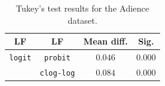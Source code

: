 \documentclass[journal]{IEEEtran}
\begin{document}
	
	\begin{table}[!t]
		\caption{Tukey's test results for the Adience dataset.}
		\label{table:TukeyAdience}
		\centering
		\begin{tabular}{cccc}
			\hline\hline
			       LF         &        LF         & Mean diff. &  Sig.   \\ \hline
			 \texttt{logit}   &  \texttt{probit}  &  $0.046$   & $0.000$ \\
			                  & \texttt{clog-log} &  $0.084$   & $0.000$ \\

\end{tabular}
\end{table}
\end{document}
